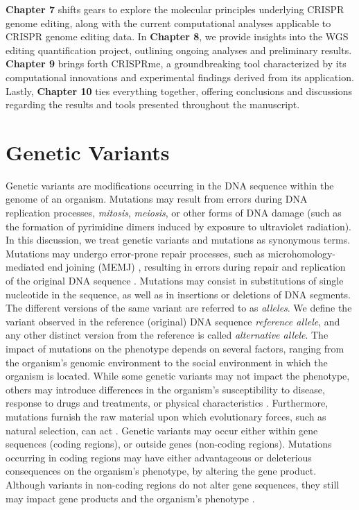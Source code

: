 \documentclass[a4paper, titlepage, openright]{book}
\newcommand{\mychapter}[2]{
    \setcounter{chapter}{#1}
    \setcounter{section}{0}
    \chapter*{#2}
    \addcontentsline{toc}{chapter}{#2}
}
\newcommand{\crisprme}{CRISPRme\xspace}
\begin{document}
\textbf{Chapter 7} shifts gears to explore the molecular principles underlying CRISPR genome editing, along with the current computational analyses applicable to CRISPR genome editing data. In \textbf{Chapter 8}, we provide insights into the WGS editing quantification project, outlining ongoing analyses and preliminary results. \textbf{Chapter 9} brings forth \crisprme, a groundbreaking tool characterized by its computational innovations and experimental findings derived from its application. Lastly, \textbf{Chapter 10} ties everything together, offering conclusions and discussions regarding the results and tools presented throughout the manuscript.

 
%
\mychapter{2}{Genetic Variants}
Genetic variants are modifications occurring in the DNA sequence within the genome of an organism. Mutations may result from errors during DNA replication processes, \emph{mitosis}, \emph{meiosis}, or other forms of DNA damage (such as the formation of pyrimidine dimers induced by exposure to ultraviolet radiation). In this discussion, we treat genetic variants and mutations as synonymous terms. Mutations may undergo error-prone repair processes, such as microhomology-mediated end joining (MEMJ) \citep{sinha2017microhomology, seol2018microhomology}, resulting in errors during repair and replication of the original DNA sequence \citep{rodgers2016error}. Mutations may consist in substitutions of single nucleotide in the sequence, as well as in insertions or deletions of DNA segments. The different versions of the same variant are referred to as \emph{alleles}. We define the variant observed in the reference (original) DNA sequence \emph{reference allele}, and any other distinct version from the reference is called \emph{alternative allele}.
The impact of mutations on the phenotype depends on several factors, ranging from the organism's genomic environment to the social environment in which the organism is located. While some genetic variants may not impact the phenotype, others may introduce differences in the organism's susceptibility to disease, response to drugs and treatments, or physical characteristics \citep{bodmer2008common, ingelman2018integrating, mitchell2007evolutionary}. Furthermore, mutations furnish the raw material upon which evolutionary forces, such as natural selection, can act \citep{akey2004population, teotonio2009experimental}. Genetic variants may occur either within gene sequences (coding regions), or outside genes (non-coding regions).  Mutations occurring in coding regions may have either advantageous or deleterious consequences on the organism's phenotype, by altering the gene product. Although variants in non-coding regions do not alter gene sequences, they still may impact gene products and the organism's phenotype \citep{zhang2015non}. 
\end{document}
